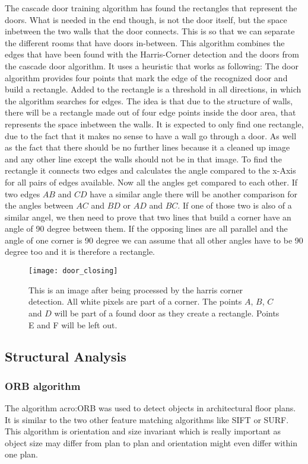 The cascade door training algorithm has found the rectangles that represent the doors. What is needed in the end though, is not the door itself, but the space inbetween the two walls that the door connects. This is so that we can separate the different rooms that have doors in-between.
This algorithm combines the edges that have been found with the Harris-Corner detection and the doors from the cascade door algorithm. It uses a heuristic that works as following: The door algorithm provides four points that mark the edge of the recognized door and build a rectangle.
Added to the rectangle is  a threshold in all directions, in which the algorithm searches for edges. The idea is that due to the structure of walls, there will be a rectangle made out of four edge points inside the door area, that represents the space inbetween the walls. It is expected to only find one rectangle, due to the fact that it makes no sense to have a wall go through a door. As well as the fact that there should be no further lines because it a cleaned up image and any other line except the walls should not be in that image.
To find the rectangle it connects two edges and calculates the angle compared to the x-Axis for all pairs of edges available. Now all the angles get compared to each other. If two edges $AB$ and $CD$ have a similar angle there will be another comparison for the angles between $AC$ and $BD$ or $AD$ and $BC$. If one of those two is also of a similar angel, we then need to prove that two lines that build a corner have an angle of 90 degree between them. If the opposing lines are all parallel and the angle of one corner is 90 degree we can assume that all other angles have to be 90 degree too and it is therefore a rectangle. 

\begin{figure}[h]
	\centering
	\texttt{[image: door\_closing]}
	\caption{This is an image after being processed by the harris corner detection. All white pixels are part of a corner. The points $A$, $B$, $C$ and $D$ will be part of a found door as they create a rectangle. Points E and F will be left out.}
	\label{fig:door_closing}
\end{figure}


\subsection{Structural Analysis}

\subsubsection{ORB algorithm}
\label{sub:ORBAlgorithm}
The algorithm \acrfull{acro:ORB} was used to detect objects in architectural floor plans. It is similar to the two other feature matching algorithms like SIFT or SURF. This algorithm is orientation and size invariant which is really important as object size may differ from plan to plan and orientation might even differ within one plan.


